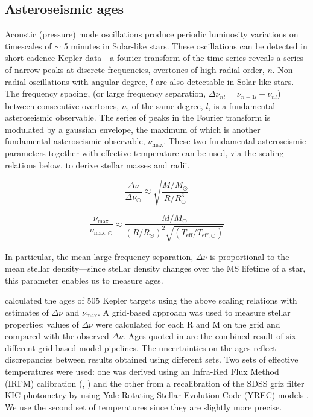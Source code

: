 \documentclass[10pt,preprint]{aastex}
\begin{document}
\subsection{Asteroseismic ages}
\label{sec:asteroseismic_targets}

Acoustic (pressure) mode oscillations produce periodic luminosity variations on timescales of $\sim$ 5 minutes in Solar-like stars.
These oscillations can be detected in short-cadence Kepler data---a fourier transform of the time series reveals a series of narrow peaks at discrete frequencies, overtones of high radial order, $n$.
Non-radial oscillations with angular degree, $l$ are also detectable in Solar-like stars.
The frequency spacing, (or large frequency separation, $\Delta\nu_{nl} = \nu_{n+1l}-\nu_{nl}$) between consecutive overtones, $n$, of the same degree, $l$, is a fundamental asteroseismic observable.
The series of peaks in the Fourier transform is modulated by a gaussian envelope, the maximum of which is another fundamental asteroseismic observable, $\nu_{\mathrm{max}}$.
These two fundamental asteroseismic parameters together with effective temperature can be used, via the scaling relations below, to derive stellar masses and radii.

\begin{equation}
\frac{\Delta\nu}{\Delta\nu_{\odot}} \approx \sqrt{\frac{M/M_{\odot}}{R/R_{\odot}^3}}
\label{eq:delta_nu}
\end{equation}

\begin{equation}
\frac{\nu_{\mathrm{max}}}{\nu_{\mathrm{max},\odot}} \approx \frac{M/M_{\odot}}{(R/R_{\odot})^2\sqrt{(T_{\mathrm{eff}}/T_{\mathrm{eff},\odot})}}
\label{eq:delta_nu}
\end{equation}

In particular, the mean large frequency separation, $\Delta\nu$ is proportional to the mean stellar density---since stellar density changes over the MS lifetime of a star, this parameter enables us to measure ages.

\citet{Chaplin2013} calculated the ages of 505 Kepler targets using the above scaling relations with estimates of $\Delta\nu$ and $\nu_{\mathrm{max}}$.
A grid-based approach was used to measure stellar properties: values of $\Delta\nu$ were calculated for each R and M on the grid and compared with the observed $\Delta\nu$.
Ages quoted in \citet{Chaplin2013} are the combined result of six different grid-based model pipelines.
The uncertainties on the ages reflect discrepancies between results obtained using different sets.
Two sets of effective temperatures were used: one was derived using an Infra-Red Flux Method (IRFM) calibration (\citealt{Casagrande2010}, \citealt{SilvaAguirre2012}) and the other from a recalibration of the SDSS griz filter KIC photometry by \citet{Pinsonneault2012} using Yale Rotating Stellar Evolution Code (YREC) models \citep{Demarque2004}.
We use the second set of temperatures since they are slightly more precise.
\end{document}

